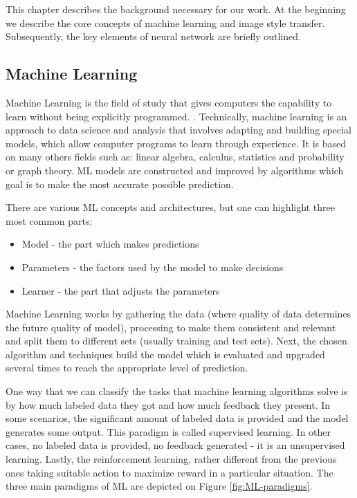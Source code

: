 \documentclass[../Main.tex]{subfiles}
\begin{document}
    This chapter describes the background necessary for our work. At the beginning we describe the core concepts of machine learning and image style transfer. Subsequently, the key elements of neural network are briefly outlined.

\subsection{Machine Learning} 
    Machine Learning is the field of study that gives computers the capability to learn without being explicitly programmed. . Technically, machine learning is an approach to data science and analysis that involves adapting and building special models, which allow computer programs to learn through experience. It is based on many others fields such as: linear algebra, calculus, statistics and probability or graph theory. ML models are constructed and improved by algorithms which goal is to make the most accurate possible prediction.
    
    There are various ML concepts and architectures, but one can highlight three most common parts:
    \begin{itemize}
        \item Model - the part which makes predictions
        \item Parameters - the factors used by the model to make decisions
        \item Learner - the part that adjusts the parameters
    \end{itemize}
    Machine Learning works by gathering the data (where quality of data determines the future quality of model), processing to make them consistent and relevant and split them to different sets (usually training and test sets). Next, the chosen algorithm and techniques build the model which is evaluated and upgraded several times to reach the appropriate level of prediction.
    
     One way that we can classify the tasks that machine learning algorithms solve is by how much labeled data they got and how much feedback they present. In some scenarios, the significant amount of labeled data is provided and the model generates some output. This paradigm is called supervised learning. In other cases, no labeled data is provided, no feedback generated - it is an unsupervised learning. Lastly, the reinforcement learning, rather different from the previous ones taking suitable action to maximize reward in a particular situation. The three main paradigms of ML are depicted on Figure \ref{fig:ML-paradigms}.
    
\end{document}
